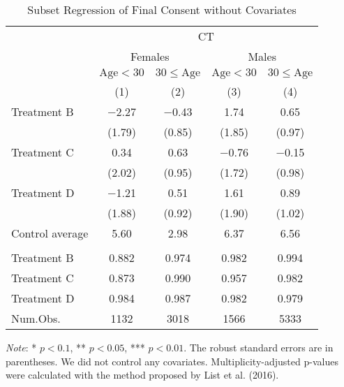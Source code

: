 \documentclass[12pt, a4paper]{article}
\begin{document}
\begin{table}[H]

\caption{\label{tab:consent-lm-subset1}Subset Regression of Final Consent without Covariates}
\centering
\fontsize{8}{10}\selectfont
\begin{threeparttable}
\begin{tabular}[t]{lcccc}
\toprule
\multicolumn{1}{c}{ } & \multicolumn{4}{c}{CT} \\
\cmidrule(l{3pt}r{3pt}){2-5}
\multicolumn{1}{c}{ } & \multicolumn{2}{c}{Females} & \multicolumn{2}{c}{Males} \\
\cmidrule(l{3pt}r{3pt}){2-3} \cmidrule(l{3pt}r{3pt}){4-5}
\multicolumn{1}{c}{ } & \multicolumn{1}{c}{$\text{Age} < 30$} & \multicolumn{1}{c}{$30 \le \text{Age}$} & \multicolumn{1}{c}{$\text{Age} < 30$} & \multicolumn{1}{c}{$30 \le \text{Age}$} \\
\cmidrule(l{3pt}r{3pt}){2-2} \cmidrule(l{3pt}r{3pt}){3-3} \cmidrule(l{3pt}r{3pt}){4-4} \cmidrule(l{3pt}r{3pt}){5-5}
  & (1) & (2) & (3) & (4)\\
\midrule
Treatment B & \num{-2.27} & \num{-0.43} & \num{1.74} & \num{0.65}\\
 & (\num{1.79}) & (\num{0.85}) & (\num{1.85}) & (\num{0.97})\\
Treatment C & \num{0.34} & \num{0.63} & \num{-0.76} & \num{-0.15}\\
 & (\num{2.02}) & (\num{0.95}) & (\num{1.72}) & (\num{0.98})\\
Treatment D & \num{-1.21} & \num{0.51} & \num{1.61} & \num{0.89}\\
 & (\num{1.88}) & (\num{0.92}) & (\num{1.90}) & (\num{1.02})\\
\midrule
Control average & 5.60 & 2.98 & 6.37 & 6.56\\
\addlinespace[0.3em]
\multicolumn{5}{l}{\textit{Multiplicity-adjusted p-values}}\\
\hspace{1em}Treatment B & 0.882 & 0.974 & 0.982 & 0.994\\
\hspace{1em}Treatment C & 0.873 & 0.990 & 0.957 & 0.982\\
\hspace{1em}Treatment D & 0.984 & 0.987 & 0.982 & 0.979\\
Num.Obs. & \num{1132} & \num{3018} & \num{1566} & \num{5333}\\
\bottomrule
\end{tabular}
\begin{tablenotes}
\item \emph{Note}: * $p < 0.1$, ** $p < 0.05$, *** $p < 0.01$. The robust standard errors are in parentheses. We did not control any covariates. Multiplicity-adjusted p-values were calculated with the method proposed by List et al. (2016).
\end{tablenotes}
\end{threeparttable}
\end{table}
\end{document}
